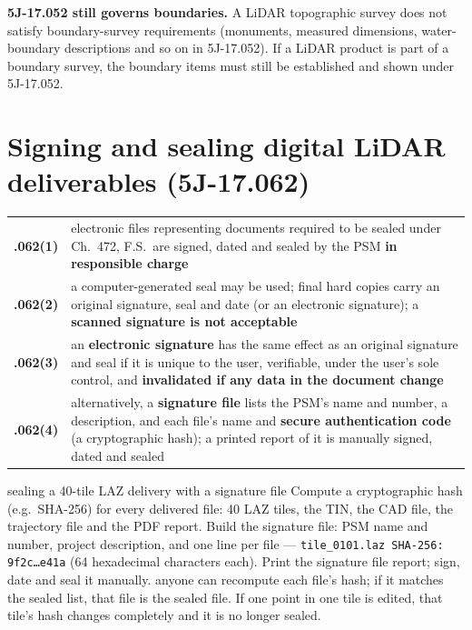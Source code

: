 \begin{tip}
\textbf{5J-17.052 still governs boundaries.} A LiDAR topographic survey does not satisfy boundary-survey requirements (monuments, measured dimensions, water-boundary descriptions and so on in 5J-17.052). If a LiDAR product is part of a boundary survey, the boundary items must still be established and shown under 5J-17.052.
\end{tip}

\section{Signing and sealing digital LiDAR deliverables (5J-17.062)}
\begin{center}\small
\renewcommand{\arraystretch}{1.22}
\begin{tabularx}{\linewidth}{>{\bfseries}p{1.9cm}X}\toprule
.062(1) & electronic files representing documents required to be sealed under Ch.\ 472, F.S.\ are signed, dated and sealed by the PSM \textbf{in responsible charge}\\
.062(2) & a computer-generated seal may be used; final hard copies carry an original signature, seal and date (or an electronic signature); a \textbf{scanned signature is not acceptable}\\
.062(3) & an \textbf{electronic signature} has the same effect as an original signature and seal if it is unique to the user, verifiable, under the user's sole control, and \textbf{invalidated if any data in the document change}\\
.062(4) & alternatively, a \textbf{signature file} lists the PSM's name and number, a description, and each file's name and \textbf{secure authentication code} (a cryptographic hash); a printed report of it is manually signed, dated and sealed\\\bottomrule
\end{tabularx}\end{center}

\begin{worked}{sealing a 40-tile LAZ delivery with a signature file}
 Compute a cryptographic hash (e.g.\ SHA-256) for every delivered file: 40 LAZ tiles, the TIN, the CAD file, the trajectory file and the PDF report.
 Build the signature file: PSM name and number, project description, and one line per file --- \texttt{tile\_0101.laz  SHA-256: 9f2c\ldots e41a} (64 hexadecimal characters each).
 Print the signature file report; sign, date and seal it manually.
 anyone can recompute each file's hash; if it matches the sealed list, that file is the sealed file. If one point in one tile is edited, that tile's hash changes completely and it is no longer sealed.
\end{worked}

